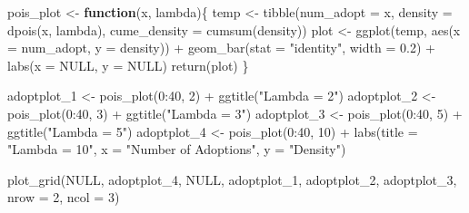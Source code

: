 \documentclass[
]{book}
\newenvironment{Shaded}{\begin{snugshade}}{\end{snugshade}}
\newcommand{\AttributeTok}[1]{\textcolor[rgb]{0.77,0.63,0.00}{#1}}
\newcommand{\ConstantTok}[1]{\textcolor[rgb]{0.00,0.00,0.00}{#1}}
\newcommand{\ControlFlowTok}[1]{\textcolor[rgb]{0.13,0.29,0.53}{\textbf{#1}}}
\newcommand{\DecValTok}[1]{\textcolor[rgb]{0.00,0.00,0.81}{#1}}
\newcommand{\FloatTok}[1]{\textcolor[rgb]{0.00,0.00,0.81}{#1}}
\newcommand{\FunctionTok}[1]{\textcolor[rgb]{0.00,0.00,0.00}{#1}}
\newcommand{\NormalTok}[1]{#1}
\newcommand{\OtherTok}[1]{\textcolor[rgb]{0.56,0.35,0.01}{#1}}
\newcommand{\SpecialCharTok}[1]{\textcolor[rgb]{0.00,0.00,0.00}{#1}}
\newcommand{\StringTok}[1]{\textcolor[rgb]{0.31,0.60,0.02}{#1}}
\begin{document}
\begin{Shaded}
\begin{Highlighting}[]
\NormalTok{pois\_plot }\OtherTok{\textless{}{-}} \ControlFlowTok{function}\NormalTok{(x, lambda)\{}
\NormalTok{  temp }\OtherTok{\textless{}{-}} \FunctionTok{tibble}\NormalTok{(}\AttributeTok{num\_adopt =}\NormalTok{ x,}
                 \AttributeTok{density =} \FunctionTok{dpois}\NormalTok{(x, lambda),}
                 \AttributeTok{cume\_density =} \FunctionTok{cumsum}\NormalTok{(density))}
\NormalTok{  plot }\OtherTok{\textless{}{-}} \FunctionTok{ggplot}\NormalTok{(temp, }\FunctionTok{aes}\NormalTok{(}\AttributeTok{x =}\NormalTok{ num\_adopt, }\AttributeTok{y =}\NormalTok{ density)) }\SpecialCharTok{+}
    \FunctionTok{geom\_bar}\NormalTok{(}\AttributeTok{stat =} \StringTok{"identity"}\NormalTok{, }\AttributeTok{width =} \FloatTok{0.2}\NormalTok{) }\SpecialCharTok{+}
    \FunctionTok{labs}\NormalTok{(}\AttributeTok{x =} \ConstantTok{NULL}\NormalTok{, }\AttributeTok{y =} \ConstantTok{NULL}\NormalTok{)}
  \FunctionTok{return}\NormalTok{(plot)}
\NormalTok{\}}

\NormalTok{adoptplot\_1 }\OtherTok{\textless{}{-}} \FunctionTok{pois\_plot}\NormalTok{(}\DecValTok{0}\SpecialCharTok{:}\DecValTok{40}\NormalTok{, }\DecValTok{2}\NormalTok{) }\SpecialCharTok{+}
  \FunctionTok{ggtitle}\NormalTok{(}\StringTok{"Lambda = 2"}\NormalTok{)}
\NormalTok{adoptplot\_2 }\OtherTok{\textless{}{-}} \FunctionTok{pois\_plot}\NormalTok{(}\DecValTok{0}\SpecialCharTok{:}\DecValTok{40}\NormalTok{, }\DecValTok{3}\NormalTok{) }\SpecialCharTok{+}
  \FunctionTok{ggtitle}\NormalTok{(}\StringTok{"Lambda = 3"}\NormalTok{)}
\NormalTok{adoptplot\_3 }\OtherTok{\textless{}{-}} \FunctionTok{pois\_plot}\NormalTok{(}\DecValTok{0}\SpecialCharTok{:}\DecValTok{40}\NormalTok{, }\DecValTok{5}\NormalTok{) }\SpecialCharTok{+}
  \FunctionTok{ggtitle}\NormalTok{(}\StringTok{"Lambda = 5"}\NormalTok{)}
\NormalTok{adoptplot\_4 }\OtherTok{\textless{}{-}} \FunctionTok{pois\_plot}\NormalTok{(}\DecValTok{0}\SpecialCharTok{:}\DecValTok{40}\NormalTok{, }\DecValTok{10}\NormalTok{) }\SpecialCharTok{+}
  \FunctionTok{labs}\NormalTok{(}\AttributeTok{title =} \StringTok{"Lambda = 10"}\NormalTok{, }\AttributeTok{x =} \StringTok{"Number of Adoptions"}\NormalTok{, }\AttributeTok{y =} \StringTok{"Density"}\NormalTok{)}

\FunctionTok{plot\_grid}\NormalTok{(}\ConstantTok{NULL}\NormalTok{, adoptplot\_4, }\ConstantTok{NULL}\NormalTok{, adoptplot\_1, adoptplot\_2, adoptplot\_3, }\AttributeTok{nrow =} \DecValTok{2}\NormalTok{, }\AttributeTok{ncol =} \DecValTok{3}\NormalTok{)}
\end{Highlighting}
\end{Shaded}
\end{document}
